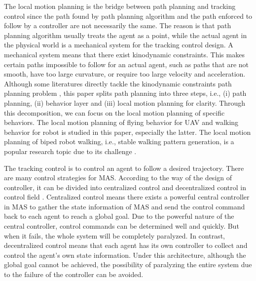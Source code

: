 \documentclass{ieeeaccess}
\begin{document}

The local motion planning is the bridge between path planning and tracking control since the path found by path planning algorithm and the path enforced to follow by a controller are not necessarily the same. The reason is that path planning algorithm usually treats the agent as a point, while the actual agent in the physical world is a mechanical system for the tracking control design. A mechanical system means that there exist kinodynamic constraints. This makes certain paths impossible to follow for an actual agent, such as paths that are not smooth, have too large curvature, or require too large velocity and acceleration. Although some literatures directly tackle the kinodynamic constraints path planning problem \cite{9384209}, this paper splits path planning into three steps, i.e., (i) path planning, (ii) behavior layer and (iii) local motion planning for clarity. Through this decomposition, we can focus on the local motion planning of specific behaviors. The local motion planning of flying behavior for UAV and walking behavior for robot is studied in this paper, especially the latter. The local motion planning of biped robot walking, i.e., stable walking pattern generation, is a popular research topic due to its challenge \cite{olcay2017design}.

The tracking control is to control an agent to follow a desired trajectory. There are many control strategies for MAS. According to the way of the design of controller, it can be divided into centralized control and decentralized control in control field \cite{8931370}. Centralized control means there exists a powerful central controller in MAS to gather the state information of MAS and send the control command back to each agent to reach a global goal. Due to the powerful nature of the central controller, control commands can be determined well and quickly. But when it fails, the whole system will be completely paralyzed. In contrast, decentralized control means that each agent has its own controller to collect and control the agent's own state information. Under this architecture, although the global goal cannot be achieved, the possibility of paralyzing the entire system due to the failure of the controller can be avoided.
\end{document}
